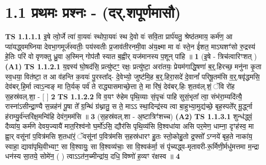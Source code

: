 \documentclass[17pt]{extarticle}
\begin{document}
     \section*{ 1.1     प्रथमः प्रश्नः - (दर्.शपूर्णमासौ) }
                                        \textbf{ TS 1.1.1.1} \newline
                  इ॒षे त्वो॒र्जे त्वा॑ वा॒यवः॑ स्थोपा॒यवः॑ स्थ दे॒वो वः॑ सवि॒ता प्रार्प॑यतु॒ श्रेष्ठ॑तमाय॒ कर्म॑ण॒ आ प्या॑यद्ध्वमघ्निया देवभा॒गमूर्ज॑स्वतीः॒ पय॑स्वतीः प्र॒जाव॑तीरनमी॒वा अ॑य॒क्ष्मा मा वः॑ स्ते॒न ई॑शत॒ माऽघशꣳ॑सो रु॒द्रस्य॑ हे॒तिः परि॑ वो वृणक्तु ध्रु॒वा अ॒स्मिन् गोप॑तौ स्यात ब॒ह्वीर् यज॑मानस्य प॒शून् पा॑हि ॥ \textbf{  1 } \newline
                  \newline
                      (इ॒षे - त्रिच॑त्वारिꣳशत् )  \textbf{(A1)} \newline \newline
                                        \textbf{ TS 1.1.2.1} \newline
                  य॒ज्ञ्स्य॑ घो॒षद॑सि॒ प्रत्यु॑ष्टꣳ॒॒ रक्षः॒ प्रत्यु॑ष्टा॒ अरा॑तयः॒ प्रेयम॑गाद्धि॒षणा॑ ब॒र्॒.हिरच्छ॒ मनु॑ना कृ॒ता स्व॒धया॒ वित॑ष्टा॒ त आ व॑हन्ति क॒वयः॑ पु॒रस्ता᳚द्- दे॒वेभ्यो॒ जुष्ट॑मि॒ह ब॒र्॒.हिरा॒सदे॑ दे॒वानां᳚ परिषू॒तम॑सि व॒र्॒.षवृ॑द्धमसि॒ देव॑बर्.हि॒र्मा त्वाऽ॒न्वङ् मा ति॒र्यक् पर्व॑ ते राद्ध्यासमाच्छे॒त्ता ते॒ मा रि॑षं॒ देव॑बर्.हिः श॒तव॑ल्.शं॒ ॅवि रो॑ह स॒हस्र॑वल्.शा॒ - [ ] \textbf{  2 } \newline
                  \newline
                                \textbf{ TS 1.1.2.2} \newline
                  वि व॒यꣳ रु॑हेम पृथि॒व्याः सं॒पृचः॑ पाहि सुसं॒भृता᳚ त्वा॒ संभ॑रा॒म्यदि॑त्यै॒ रास्ना॑ऽसीन्द्रा॒ण्यै स॒न्नह॑नं पू॒षा ते᳚ ग्र॒न्थिं ग्र॑थ्नातु॒ स ते॒ माऽऽ स्था॒दिन्द्र॑स्य त्वा बा॒हुभ्या॒मुद्य॑च्छे॒ बृह॒स्पते᳚र् मू॒र्द्ध्ना ह॑राम्यु॒र्व॑न्तरि॑क्ष॒मन्वि॑हि देवंग॒मम॑सि ॥ \textbf{  3 } \newline
                  \newline
                      (स॒हस्र॑वल्.शा - अ॒ष्टात्रिꣳ॑शच्च)  \textbf{(A2)} \newline \newline
                                        \textbf{ TS 1.1.3.1} \newline
                  शुन्ध॑द्ध्वं॒ दैव्या॑य॒ कर्म॑णे देवय॒ज्यायै॑ मात॒रिश्व॑नो घ॒र्मो॑ऽसि॒ द्यौर॑सि पृथि॒व्य॑सि वि॒श्वधा॑या असि पर॒मेण॒ धाम्ना॒ दृꣳह॑स्व॒ मा ह्वा॒र् वसू॑नां प॒वित्र॑मसि श॒तधा॑रं॒ ॅवसू॑नां प॒वित्र॑मसि स॒हस्र॑धारꣳ हु॒तः स्तो॒कोहु॒तो द्र॒फ्सो᳚ ऽग्नये॑ बृह॒ते नाका॑य॒ स्वाहा॒ द्यावा॑पृथि॒वीभ्याꣳ॒॒ सा वि॒श्वायुः॒ सा वि॒श्वव्य॑चाः॒ सा वि॒श्वक॑र्मा॒ सं पृ॑च्यद्ध्व-मृतावरी-रू॒र्मिणी॒र्मधु॑मत्तमा म॒न्द्रा धन॑स्य सा॒तये॒ सोमे॑न॒ ( ) त्वाऽऽत॑न॒च्मीन्द्रा॑य॒ दधि॒ विष्णो॑ ह॒व्यꣳ र॑क्षस्व ॥ \textbf{  4 } \newline
\end{document}
